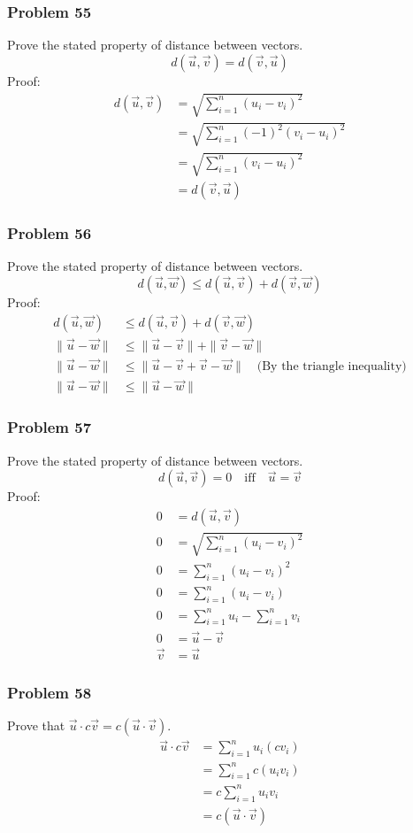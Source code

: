 \documentclass[letterpaper, 12pt]{math}
\begin{document}
\subsubsection*{Problem 55}
Prove the stated property of distance between vectors.
\[ d(\vec{u},\vec{v}) = d(\vec{v},\vec{u}) \]
Proof:
\begin{align*}
  d(\vec{u},\vec{v}) &= \sqrt{\sum_{i=1}^{n}(u_i-v_i)^2} \\
  &= \sqrt{\sum_{i=1}^{n}(-1)^2(v_i-u_i)^2} \\
  &= \sqrt{\sum_{i=1}^{n}(v_i-u_i)^2} \\
  &= d(\vec{v},\vec{u})
\end{align*}

\subsubsection*{Problem 56}
Prove the stated property of distance between vectors.
\[ d(\vec{u},\vec{w}) \le d(\vec{u},\vec{v})+d(\vec{v},\vec{w}) \]
Proof:
\begin{align*}
  d(\vec{u},\vec{w}) &\le d(\vec{u},\vec{v})+d(\vec{v},\vec{w}) \\
  \|\vec{u}-\vec{w}\| &\le \|\vec{u}-\vec{v}\|+\|\vec{v}-\vec{w}\| \\
  \|\vec{u}-\vec{w}\| &\le \|\vec{u}-\vec{v}+\vec{v}-\vec{w}\|
    \quad\text{(By the triangle inequality)} \\
  \|\vec{u}-\vec{w}\| &\le \|\vec{u}-\vec{w}\|
\end{align*}

\subsubsection*{Problem 57}
Prove the stated property of distance between vectors.
\[ d(\vec{u},\vec{v}) = 0 \quad\text{iff}\quad \vec{u} = \vec{v} \]
Proof:
\begin{align*}
  0 &= d(\vec{u},\vec{v}) \\
  0 &= \sqrt{\sum_{i=1}^{n}(u_i-v_i)^2} \\
  0 &= \sum_{i=1}^{n}(u_i-v_i)^2 \\
  0 &= \sum_{i=1}^{n}(u_i-v_i) \\
  0 &= \sum_{i=1}^{n}u_i-\sum_{i=1}^{n}v_i \\
  0 &= \vec{u}-\vec{v} \\
  \vec{v} &= \vec{u}
\end{align*}

\subsubsection*{Problem 58}
Prove that \( \vec{u}\cdot c\vec{v} = c(\vec{u}\cdot\vec{v}) \).
\begin{align*}
  \vec{u}\cdot c\vec{v} &= \sum_{i=1}^{n}u_{i}(cv_{i}) \\
  &= \sum_{i=1}^{n}c(u_{i}v_{i}) \\
  &= c\sum_{i=1}^{n}u_{i}v_{i} \\
  &= c(\vec{u}\cdot\vec{v})
\end{align*}
\end{document}
